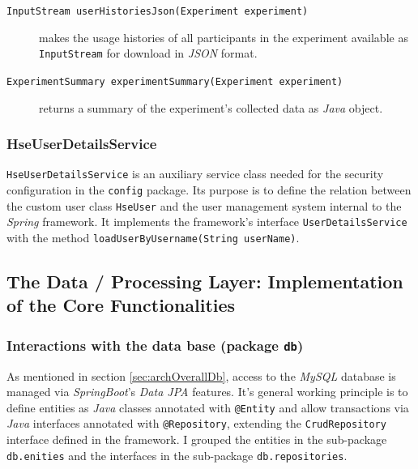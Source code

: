 \documentclass[a4paper]{usiinfbachelorproject}
\begin{document}
\begin{description}
        \item[\texttt{InputStream userHistoriesJson(Experiment experiment)}] makes the usage histories of all participants
                    in the experiment available as \texttt{InputStream} for download in \emph{JSON} format.

        \item[\texttt{ExperimentSummary experimentSummary(Experiment experiment)}] returns a summary of the experiment's collected data
                    as \emph{Java} object.

    \end{description}


\subsubsection{\textbf{HseUserDetailsService}}

\texttt{HseUserDetailsService} is an auxiliary service class needed for the security configuration in the
\texttt{config} package. Its purpose is to define the relation between the custom user class \texttt{HseUser} 
and the user management system internal to the \emph{Spring} framework. It implements the framework's
interface \texttt{UserDetailsService} with the method \texttt{loadUserByUsername(String userName)}.


\subsection{\textbf{The Data / Processing Layer: Implementation of the Core Functionalities}} \label{sec:archDataLayer}

\subsubsection{\textbf{Interactions with the data base (package \texttt{db})}} \label{sec:archDataLayerDb}

As mentioned in section \ref{sec:archOverallDb}, access to the \emph{MySQL} database is managed via \emph{SpringBoot}'s
\emph{Data JPA} features. It's general working principle is to define entities as \emph{Java} classes annotated
with \texttt{@Entity} and allow transactions via \emph{Java} interfaces annotated with \texttt{@Repository},
extending the \texttt{CrudRepository} interface defined in the framework. 
I grouped the entities in the sub-package \texttt{db.enities} and the
interfaces in the sub-package \texttt{db.repositories}.
\end{document}
